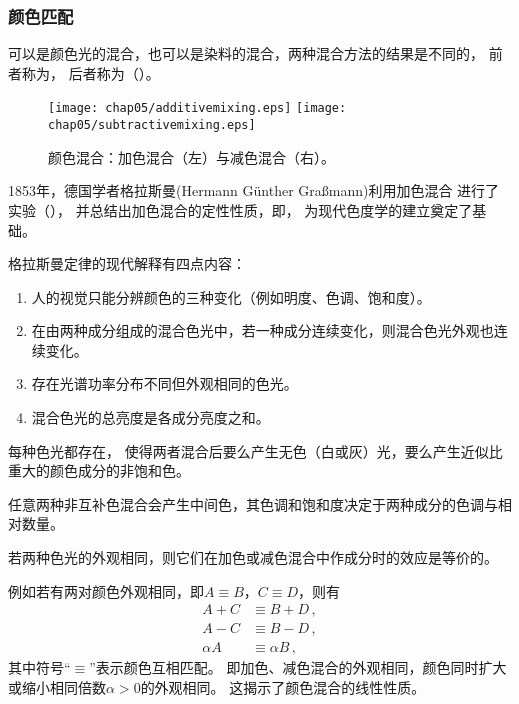 \subsubsection*{颜色匹配}
可以是颜色光的混合，也可以是染料的混合，两种混合方法的结果是不同的，
前者称为，
后者称为（）。
\begin{figure}[htb]
      \centering
      \texttt{[image: chap05/additivemixing.eps]}
      \texttt{[image: chap05/subtractivemixing.eps]}
      \caption{颜色混合：加色混合（左）与减色混合（右）。}
      \label{fig:5.ex06}
\end{figure}

1853年，德国学者格拉斯曼(Hermann Günther Gra{\ss}mann)利用加色混合
进行了实验（），
并总结出加色混合的定性性质，即，
为现代色度学的建立奠定了基础。

\begin{proposition}
      格拉斯曼定律的现代解释有四点内容：
      \begin{enumerate}
            \item 人的视觉只能分辨颜色的三种变化（例如明度、色调、饱和度）。
            \item 在由两种成分组成的混合色光中，若一种成分连续变化，则混合色光外观也连续变化。
            \item 存在光谱功率分布不同但外观相同的色光。
            \item 混合色光的总亮度是各成分亮度之和。
      \end{enumerate}
\end{proposition}
\begin{corollary}
      每种色光都存在，
      使得两者混合后要么产生无色（白或灰）光，要么产生近似比重大的颜色成分的非饱和色。
\end{corollary}
\begin{corollary}
      任意两种非互补色混合会产生中间色，其色调和饱和度决定于两种成分的色调与相对数量。
\end{corollary}
\begin{corollary}
      若两种色光的外观相同，则它们在加色或减色混合中作成分时的效应是等价的。
\end{corollary}

例如若有两对颜色外观相同，即$A\equiv B$，$C\equiv D$，则有
\begin{align}
      A+C      & \equiv B+D\, ,      \\
      A-C      & \equiv B-D\, ,      \\
      \alpha A & \equiv \alpha B\, ,
\end{align}
其中符号“$\equiv$”表示颜色互相匹配。
即加色、减色混合的外观相同，颜色同时扩大或缩小相同倍数$\alpha>0$的外观相同。
这揭示了颜色混合的线性性质。


